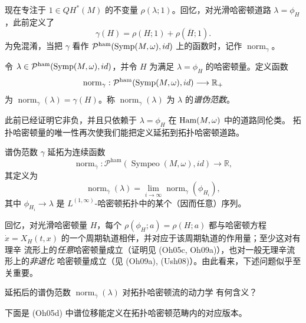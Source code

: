 现在专注于 $1\in QH^*(M)$ 的不变量 $\rho(\lambda;1)$。回忆，对光滑哈密顿道路
$\lambda=\phi_H$，此前定义了
\[
 \gamma(H)=\rho(H;1)+\rho(\overline H;1).
\]
为免混淆，当把 $\gamma$ 看作
$\mathcal P^{\mathrm{ham}}(\operatorname{Symp}(M,\omega),id)$ 上的函数时，记作
$\operatorname{norm}_\gamma$。

\begin{definition}[谱伪范数]
\label{def:22-spectral-pseudonorm}
令 $\lambda\in\mathcal P^{\mathrm{ham}}(\operatorname{Symp}(M,\omega),id)$，并令 $H$ 为满足
$\lambda=\phi_H$ 的哈密顿量。定义函数
\[
 \operatorname{norm}_\gamma:
 \mathcal P^{\mathrm{ham}}(\operatorname{Symp}(M,\omega),id)\longrightarrow\mathbb R_+
\]
为 $\operatorname{norm}_\gamma(\lambda)=\gamma(H)$。称
$\operatorname{norm}_\gamma(\lambda)$ 为 $\lambda$ 的\emph{谱伪范数}。
\end{definition}

此前已经证明它非负，并且只依赖于 $\lambda=\phi_H$ 在 $\operatorname{Ham}(M,\omega)$ 中的道路同伦类。
拓扑哈密顿量的唯一性再次使我们能把定义延拓到拓扑哈密顿道路。

\begin{proposition}
\label{prop:22-topological-spectral-pseudonorm}
谱伪范数 $\gamma$ 延拓为连续函数
\[
 \operatorname{norm}_{\overline\gamma}:
 \mathcal P^{\mathrm{ham}}(\operatorname{Sympeo}(M,\omega),id)
 \longrightarrow\mathbb R,
\]
其定义为
\begin{equation}
 \operatorname{norm}_{\overline\gamma}(\lambda)
 =\lim_{i\to\infty}\operatorname{norm}_\gamma(\phi_{H_i}),
 \label{eq:22-topological-spectral-pseudonorm}
\end{equation}
其中 $\phi_{H_i}\to\lambda$ 是 $L^{(1,\infty)}$-哈密顿拓扑中的某个（因而任意）序列。
\end{proposition}

回忆，对光滑哈密顿量 $H$，每个
$\rho(\phi_H;a)=\rho(H;a)$ 都与哈密顿方程
$\dot x=X_H(t,x)$ 的一个周期轨道相伴，并对应于该周期轨道的作用量；至少这对有理辛
流形上的\emph{任意}哈密顿量成立（证明见 (Oh05c, Oh09a)），也对一般无理辛流形上的\emph{非退化}
哈密顿量成立（见 (Oh09a), (Ush08)）。由此看来，下述问题似乎至关重要。

\begin{question}
\label{ques:22-topological-pseudonorm-dynamics}
延拓后的谱伪范数 $\operatorname{norm}_{\overline\gamma}(\lambda)$ 对拓扑哈密顿流的动力学
有何含义？
\end{question}

下面是 (Oh05d) 中谱位移能定义在拓扑哈密顿范畴内的对应版本。

